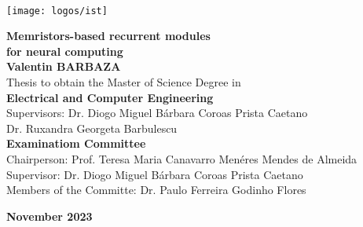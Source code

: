 \newcommand\blurredimage[3]{
  \node[opacity=0.2] at (#1) {\texttt{[image: \#3]}};
  \node[opacity=0.2] at (#1+ #2, #2) {\texttt{[image: \#3]}};
  \node[opacity=0.2] at (#1+-#2, #2) {\texttt{[image: \#3]}};
  \node[opacity=0.2] at (#1+-#2,-#2) {\texttt{[image: \#3]}};
  \node[opacity=0.2] at (#1+ #2,-#2) {\texttt{[image: \#3]}};
}

\setcounter{page}{1} 


\thispagestyle{empty}

\begin{flushleft}
  ~\\ \vspace{-12mm} \hspace{-12mm}
  \texttt{[image: logos/ist]}
  \\ \begin{center}
    
  \end{center} %

  \vspace{5mm}
  \centering
  \LARGE \textbf{Memristors-based recurrent modules\\for neural computing}
  \\ \vspace{15mm}
  \Large \textbf{Valentin BARBAZA} \\
  \vspace{12mm}
  \large Thesis to obtain the Master of Science Degree in
  \\ \vspace{2mm}
  \LARGE \textbf{Electrical and Computer Engineering}
  \\ \vspace{10mm}
  \large Supervisors: Dr. Diogo Miguel B\'{a}rbara Coroas Prista Caetano\\
  \large  Dr. Ruxandra Georgeta Barbulescu
  \\ \vspace{15mm}
  \Large \textbf{Examinatiom Committee}
  \\ \vspace{5mm}
  \large Chairperson: Prof. Teresa Maria Canavarro Men\'{e}res Mendes de Almeida\\
  \large Supervisor: Dr. Diogo Miguel B\'{a}rbara Coroas Prista Caetano\\
  \large Members of the Committe: Dr. Paulo Ferreira Godinho Flores

  \vspace{10mm}

  \Large \textbf{November 2023} \\
  \let\thepage\relax
\end{flushleft}
\pagebreak


